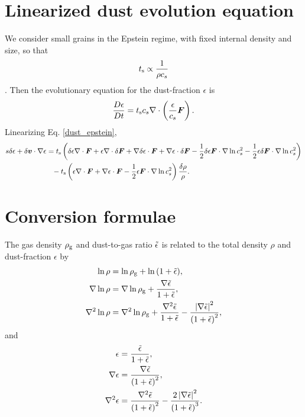\section{Linearized dust evolution equation}
We consider small grains in the Epstein regime, with fixed internal
density and size, so that
\begin{align}
  t_\mathrm{s} \propto \frac{1}{\rho c_s}
\end{align}
\citep{price15}. 
Then the evolutionary equation for the dust-fraction $\epsilon$ is 
\begin{align}\label{dust_epstein}
  \frac{D\epsilon}{Dt} = t_\mathrm{s} c_s \nabla \cdot
  \left(\frac{\epsilon}{c_s}\bm{F}\right). 
\end{align} 
Linearizing Eq. \ref{dust_epstein},
\begin{align}
  s \delta\epsilon + \delta\bm{v}\cdot\nabla\epsilon &= t_\mathrm{s}
  \left(\delta\epsilon\nabla\cdot\bm{F} + \epsilon\nabla\cdot\delta\bm{F} +  
  \nabla\delta\epsilon\cdot\bm{F} + \nabla \epsilon\cdot\delta\bm{F} -
  \frac{1}{2}\delta\epsilon\bm{F}\cdot\nabla\ln{c_s^2} -
  \frac{1}{2}\epsilon\delta\bm{F}\cdot\nabla\ln{c_s^2} \right)
  \notag\\
  &\phantom{=} - t_\mathrm{s} \left(\epsilon\nabla\cdot\bm{F} +
  \nabla\epsilon\cdot\bm{F}-\frac{1}{2}\epsilon\bm{F}\cdot\nabla\ln{c_s^2}\right)\frac{\delta\rho}{\rho}.
\end{align}


\section{Conversion formulae}
The gas density $\rho_\mathrm{g}$ and dust-to-gas ratio $\tilde{\epsilon}$ is related
to the total density $\rho$ and dust-fraction $\epsilon$ by
\begin{align}
  \ln{\rho} &= \ln{\rho_\mathrm{g}} + \ln{\left(1 + \tilde{\epsilon}\right)},\\
  \nabla\ln{\rho} &= \nabla\ln{\rho_\mathrm{g}} + \frac{\nabla\tilde{\epsilon}}{1+
    \tilde{\epsilon}},\\
  \nabla^2\ln{\rho} &= \nabla^2\ln{\rho_\mathrm{g}} +
  \frac{\nabla^2\tilde{\epsilon}}{1+\tilde{\epsilon}} -
  \frac{\left|\nabla\tilde{\epsilon}\right|^2}{\left(1+\tilde{\epsilon}\right)^2}, 
\end{align}
and
\begin{align}
  \epsilon &= \frac{\tilde{\epsilon}}{1+ \tilde{\epsilon}},\\
 \nabla\epsilon & =
 \frac{\nabla\tilde{\epsilon}}{\left(1+\tilde{\epsilon}\right)^2},\\
 \nabla^2\epsilon &=
 \frac{\nabla^2\tilde{\epsilon}}{\left(1+\tilde{\epsilon}\right)^2} -
 \frac{2\left|\nabla\tilde{\epsilon}\right|^2}{\left(1+\tilde{\epsilon}\right)^3}. 
\end{align}
